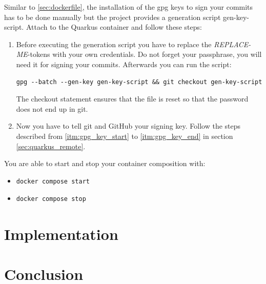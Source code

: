         Similar to \ref{sec:dockerfile}, the installation of the gpg keys to sign your commits has to be done manually but the project provides a generation script gen-key-script. Attach to the Quarkus container and follow these steps:
        \begin{enumerate}
            \item Before executing the generation script you have to replace the \textit{REPLACE-ME}-tokens with your own credentials. Do not forget your passphrase, you will need it for signing your commits. Afterwards you can run the script: 
            \begin{lstlisting}[style=bash]
gpg --batch --gen-key gen-key-script && git checkout gen-key-script
            \end{lstlisting}
            The checkout statement ensures that the file is reset so that the password does not end up in git.
            \item Now you have to tell git and GitHub your signing key. Follow the steps described from \ref{itm:gpg_key_start} to \ref{itm:gpg_key_end} in section \ref{sec:quarkus_remote}.
            \end{enumerate}

        You are able to start and stop your container composition with:
        \begin{itemize}
            \item 
                \begin{lstlisting}[style=bash]
docker compose start 
                \end{lstlisting}
                
            \item 
                \begin{lstlisting}[style=bash]
docker compose stop  
                \end{lstlisting}
            \end{itemize}



 
    

\chapter{Implementation}


\chapter{Conclusion} %


